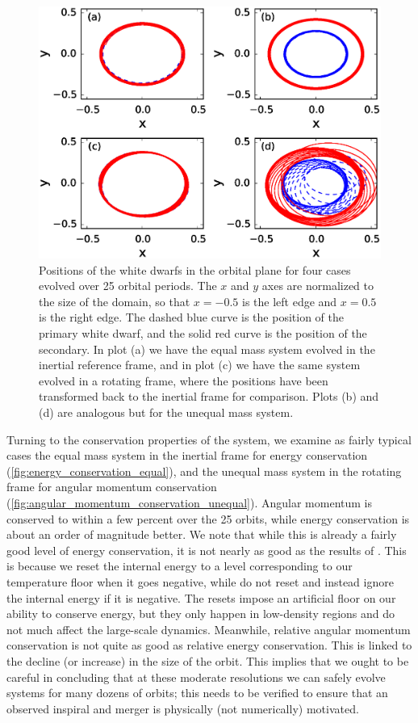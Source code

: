 \documentclass[iop]{../emulateapj}
\begin{document}
\begin{figure}
  \centering
  \includegraphics[scale=0.7]{plots/circular_orbit_comparison}
  \caption{Positions of the white dwarfs in the orbital plane for four
    cases evolved over 25 orbital periods.  The $x$ and $y$ axes are
    normalized to the size of the domain, so that $x = -0.5$ is the
    left edge and $x = 0.5$ is the right edge. The dashed blue curve
    is the position of the primary white dwarf, and the solid red
    curve is the position of the secondary. In plot (a) we have the
    equal mass system evolved in the inertial reference frame, and in
    plot (c) we have the same system evolved in a rotating frame,
    where the positions have been transformed back to the inertial
    frame for comparison.  Plots (b) and (d) are analogous but for the
    unequal mass system.\label{fig:circular_orbit_comparison}}
\end{figure}

Turning to the conservation properties of the system, we examine as
fairly typical cases the equal mass system in the inertial frame for
energy conservation (\autoref{fig:energy_conservation_equal}), and the
unequal mass system in the rotating frame for angular momentum
conservation (\autoref{fig:angular_momentum_conservation_unequal}).
Angular momentum is conserved to within a few percent over the 25
orbits, while energy conservation is about an order of magnitude
better. We note that while this is already a fairly good level of
energy conservation, it is not nearly as good as the results of
\citet{marcello:2012}. This is because we reset the internal energy to
a level corresponding to our temperature floor when it goes negative,
while \citeauthor{marcello:2012} do not reset and instead ignore the
internal energy if it is negative. The resets impose an artificial
floor on our ability to conserve energy, but they only happen in
low-density regions and do not much affect the large-scale dynamics.
Meanwhile, relative angular momentum conservation is not quite as good 
as relative energy conservation.  This is
linked to the decline (or increase) in the size of the orbit. This
implies that we ought to be careful in concluding that at these
moderate resolutions we can safely evolve systems for many dozens of
orbits; this needs to be verified to ensure that an observed inspiral
and merger is physically (not numerically) motivated.
\end{document}
